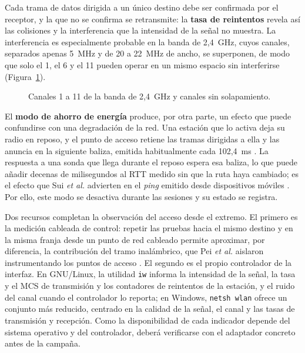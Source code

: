 Cada trama de datos dirigida a un único destino debe ser confirmada por el receptor, y la que no se confirma se retransmite: la \textbf{tasa de reintentos} revela así las colisiones y la interferencia que la intensidad de la señal no muestra. La interferencia es especialmente probable en la banda de 2,4~GHz, cuyos canales, separados apenas 5~MHz y de 20 a 22~MHz de ancho, se superponen, de modo que solo el 1, el 6 y el 11 pueden operar en un mismo espacio sin interferirse (Figura~\ref{fig:canales_24}).

\begin{figure}[htbp]
  \centering
  
  \caption{Canales 1 a 11 de la banda de 2,4~GHz y canales sin solapamiento.}
  \label{fig:canales_24}
  \raggedright
\end{figure}

El \textbf{modo de ahorro de energía} produce, por otra parte, un efecto que puede confundirse con una degradación de la red. Una estación que lo activa deja su radio en reposo, y el punto de acceso retiene las tramas dirigidas a ella y las anuncia en la siguiente baliza, emitida habitualmente cada 102,4~ms \cite{ieee80211}. La respuesta a una sonda que llega durante el reposo espera esa baliza, lo que puede añadir decenas de milisegundos al RTT medido sin que la ruta haya cambiado; es el efecto que Sui \textit{et al.} advierten en el \textit{ping} emitido desde dispositivos móviles \cite{sui2016wifiseer}. Por ello, este modo se desactiva durante las sesiones y su estado se registra.

Dos recursos completan la observación del acceso desde el extremo. El primero es la medición cableada de control: repetir las pruebas hacia el mismo destino y en la misma franja desde un punto de red cableado permite aproximar, por diferencia, la contribución del tramo inalámbrico, que Pei \textit{et al.} aislaron instrumentando los puntos de acceso \cite{pei2016weakest}. El segundo es el propio controlador de la interfaz. En GNU/Linux, la utilidad \texttt{iw} informa la intensidad de la señal, la tasa y el MCS de transmisión y los contadores de reintentos de la estación, y el ruido del canal cuando el controlador lo reporta; en Windows, \texttt{netsh~wlan} ofrece un conjunto más reducido, centrado en la calidad de la señal, el canal y las tasas de transmisión y recepción. Como la disponibilidad de cada indicador depende del sistema operativo y del controlador, deberá verificarse con el adaptador concreto antes de la campaña.

